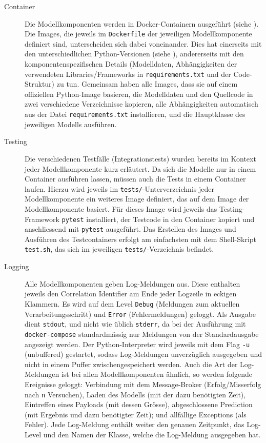 \begin{description}
    \item[Container] Die Modellkomponenten werden in Docker-Containern ausgeführt (siehe ). Die Images, die jeweils im \texttt{Dockerfile} der jeweiligen Modellkomponente definiert sind, unterscheiden sich dabei voneinander. Dies hat einerseits mit den unterschiedlichen Python-Versionen (siehe ), andererseits mit den komponentenspezifischen Details (Modelldaten, Abhängigkeiten der verwendeten Libraries/Frameworks in \texttt{requirements.txt} und der Code-Struktur) zu tun. Gemeinsam haben alle Images, dass sie auf einem offiziellen Python-Image basieren, die Modelldaten und den Quellcode in zwei verschiedene Verzeichnisse kopieren, alle Abhängigkeiten automatisch aus der Datei \texttt{requirements.txt} installieren, und die Hauptklasse des jeweiligen Modells ausführen.
    \item[Testing] Die verschiedenen Testfälle (Integrationstests) wurden bereits im Kontext jeder Modellkomponente kurz erläutert. Da sich die Modelle nur in einem Container ausführen lassen, müssen auch die Tests in einem Container laufen. Hierzu wird jeweils im \texttt{tests/}-Unterverzeichnis jeder Modellkomponente ein weiteres Image definiert, das auf dem Image der Modellkomponente basiert. Für dieses Image wird jeweils das Testing-Framework \texttt{pytest} installiert, der Testcode in den Container kopiert und anschliessend mit \texttt{pytest} ausgeführt. Das Erstellen des Images und Ausführen des Testcontainers erfolgt am einfachsten mit dem Shell-Skript \texttt{test.sh}, das sich im jeweiligen \texttt{tests/}-Verzeichnis befindet.
    \item[Logging] Alle Modellkomponenten geben Log-Meldungen aus. Diese enthalten jeweils den Correlation Identifier am Ende jeder Logzeile in eckigen Klammern. Es wird auf dem Level \texttt{Debug} (Meldungen zum aktuellen Verarbeitungsschritt) und \texttt{Error} (Fehlermeldungen) geloggt. Als Ausgabe dient \texttt{stdout}, und nicht wie üblich \texttt{stderr}, da bei der Ausführung mit \texttt{docker-compose} standardmässig nur Meldungen von der Standardausgabe angezeigt werden. Der Python-Interpreter wird jeweils mit dem Flag \texttt{-u} (unbuffered) gestartet, sodass Log-Meldungen unverzüglich ausgegeben und nicht in einem Puffer zwischengespeichert werden. Auch die Art der Log-Meldungen ist bei allen Modellkomponenten ähnlich, so werden folgende Ereignisse geloggt: Verbindung mit dem Message-Broker (Erfolg/Misserfolg nach \texttt{n} Versuchen), Laden des Modells (mit der dazu benötigten Zeit), Eintreffen eines Payloads (mit dessen Grösse), abgeschlossene Prediction (mit Ergebnis und dazu benötigter Zeit); und allfällige Exceptions (als Fehler). Jede Log-Meldung enthält weiter den genauen Zeitpunkt, das Log-Level und den Namen der Klasse, welche die Log-Meldung ausgegeben hat.

\end{description}
